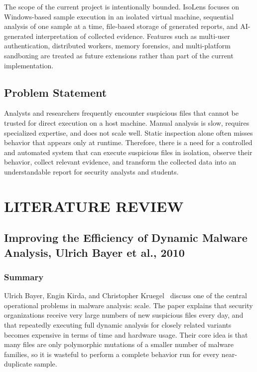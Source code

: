 \documentclass[a4paper,12pt,oneside]{report}
\begin{document}
\par

\par

The scope of the current project is intentionally bounded. IsoLens focuses on Windows-based sample execution in an isolated virtual machine, sequential analysis of one sample at a time, file-based storage of generated reports, and AI-generated interpretation of collected evidence. Features such as multi-user authentication, distributed workers, memory forensics, and multi-platform sandboxing are treated as future extensions rather than part of the current implementation.

\section{Problem Statement}
Analysts and researchers frequently encounter suspicious files that cannot be trusted for direct execution on a host machine. Manual analysis is slow, requires specialized expertise, and does not scale well. Static inspection alone often misses behavior that appears only at runtime. Therefore, there is a need for a controlled and automated system that can execute suspicious files in isolation, observe their behavior, collect relevant evidence, and transform the collected data into an understandable report for security analysts and students.

\chapter{LITERATURE REVIEW}
\section{Improving the Efficiency of Dynamic Malware Analysis, Ulrich Bayer et al., 2010}

\subsection{Summary}
Ulrich Bayer, Engin Kirda, and Christopher Kruegel~\cite{bayer2010} discuss one of the central operational problems in malware analysis: scale. The paper explains that security organizations receive very large numbers of new suspicious files every day, and that repeatedly executing full dynamic analysis for closely related variants becomes expensive in terms of time and hardware usage. Their core idea is that many files are only polymorphic mutations of a smaller number of malware families, so it is wasteful to perform a complete behavior run for every near-duplicate sample.
\end{document}
